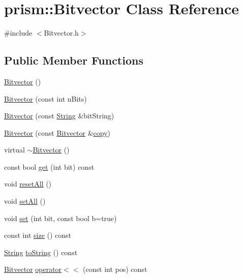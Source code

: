 \hypertarget{classprism_1_1_bitvector}{}\section{prism\+:\+:Bitvector Class Reference}
\label{classprism_1_1_bitvector}


{\ttfamily \#include $<$Bitvector.\+h$>$}

\subsection*{Public Member Functions}
\begin{DoxyCompactItemize}
\item 
\hyperlink{classprism_1_1_bitvector_a41d5de4bbd7bf193121a1614cf6b3b3b}{Bitvector} ()
\item 
\hyperlink{classprism_1_1_bitvector_ae2c403debb39b93d7de3317deb0daeeb}{Bitvector} (const int n\+Bits)
\item 
\hyperlink{classprism_1_1_bitvector_aaf4223cb87ea463a8f329a5599644314}{Bitvector} (const \hyperlink{classprism_1_1_string}{String} \&bit\+String)
\item 
\hyperlink{classprism_1_1_bitvector_a9b0b8f78113cbce3082f2c67fb702a6c}{Bitvector} (const \hyperlink{classprism_1_1_bitvector}{Bitvector} \&\hyperlink{namespaceprism_ae776f4cd825f79e7af1cf6ee1d90a209}{copy})
\item 
virtual \hyperlink{classprism_1_1_bitvector_ac68d7732ae33ccded5b5ef5971280c6d}{$\sim$\+Bitvector} ()
\item 
const bool \hyperlink{classprism_1_1_bitvector_a0a3d203905a1125a2afbdd928997dbe2}{get} (int bit) const 
\item 
void \hyperlink{classprism_1_1_bitvector_abdf123d4a94086c5525ce7d8eed8a6e3}{reset\+All} ()
\item 
void \hyperlink{classprism_1_1_bitvector_aaa4362884a96b180fd45dd261423a7e3}{set\+All} ()
\item 
void \hyperlink{classprism_1_1_bitvector_af6dd4b91e57bb6a95f30c55fdb1ce6a5}{set} (int bit, const bool b=true)
\item 
const int \hyperlink{classprism_1_1_bitvector_aefc31462d8a52013191e0df4f45ccae4}{size} () const 
\item 
\hyperlink{classprism_1_1_string}{String} \hyperlink{classprism_1_1_bitvector_a2639e8ad277f15e545e2ec78db17ab4c}{to\+String} () const 
\item 
\hyperlink{classprism_1_1_bitvector}{Bitvector} \hyperlink{classprism_1_1_bitvector_a0d5163be9867dee195648df83273076a}{operator$<$$<$} (const int pos) const 

\end{DoxyCompactItemize}
